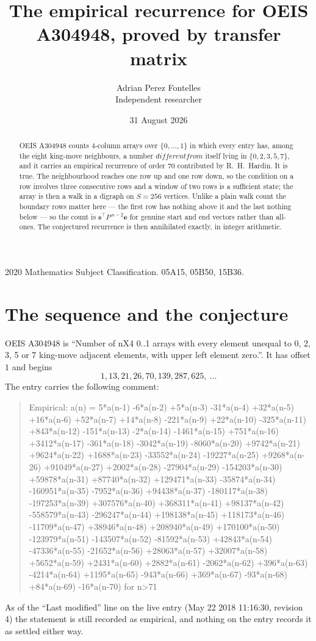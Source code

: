 \documentclass[11pt,a4paper]{article}
\title{The empirical recurrence for OEIS A304948, proved by transfer matrix}
\author{Adrian Perez Fontelles\\ \small Independent researcher}
\date{31 August 2026}
\theoremstyle{plain}
\theoremstyle{definition}
\begin{document}
\maketitle

\begin{abstract}
OEIS A304948 counts $4$-column arrays over $\{0,\dots,1\}$ in which every entry has,
among the eight king-move neighbours, a number $different from$ itself lying in $\{0,2,3,5,7\}$, and it carries an empirical
recurrence of order $70$ contributed by R.~H.~Hardin. It is true. The neighbourhood
reaches one row up and one row down, so the condition on a row involves three consecutive
rows and a window of two rows is a sufficient state; the array is then a walk in a digraph
on $S=256$ vertices. Unlike a plain walk count the boundary rows matter here --- the first
row has nothing above it and the last nothing below --- so the count is
$\mathbf{s}^{\!\top}P^{\,n-2}\mathbf{e}$ for genuine start and end vectors rather than
all-ones. The conjectured recurrence is then annihilated exactly, in integer arithmetic.
\end{abstract}

\noindent\small 2020 Mathematics Subject Classification. 05A15, 05B50, 15B36.\normalsize

\section{The sequence and the conjecture}

OEIS A304948 is ``Number of nX4 0..1 arrays with every element unequal to 0, 2, 3, 5 or 7 king-move adjacent elements, with upper left element zero.''. It has offset
$1$ and begins
\[
1, 13, 21, 26, 70, 139, 287, 625,\ \dots
\]
The entry carries the following comment:
\begin{quote}\small
Empirical: a(n) = 5*a(n-1) -6*a(n-2) +5*a(n-3) -31*a(n-4) +32*a(n-5) +16*a(n-6) +52*a(n-7) +14*a(n-8) -221*a(n-9) +22*a(n-10) -325*a(n-11) +843*a(n-12) -151*a(n-13) -2*a(n-14) -1461*a(n-15) +751*a(n-16) +3412*a(n-17) -361*a(n-18) -3042*a(n-19) -8060*a(n-20) +9742*a(n-21) +9624*a(n-22) +1688*a(n-23) -33552*a(n-24) -19227*a(n-25) +9268*a(n-26) +91049*a(n-27) +2002*a(n-28) -27904*a(n-29) -154203*a(n-30) +59878*a(n-31) +87740*a(n-32) +129471*a(n-33) -35874*a(n-34) -160951*a(n-35) -7952*a(n-36) +94438*a(n-37) -180117*a(n-38) -197253*a(n-39) +307576*a(n-40) +368311*a(n-41) +98137*a(n-42) -558579*a(n-43) -296247*a(n-44) +198138*a(n-45) +118173*a(n-46) -11709*a(n-47) +38946*a(n-48) +208940*a(n-49) +170100*a(n-50) -123979*a(n-51) -143507*a(n-52) -81592*a(n-53) +42843*a(n-54) -47336*a(n-55) -21652*a(n-56) +28063*a(n-57) +32007*a(n-58) +5652*a(n-59) +2431*a(n-60) +2882*a(n-61) -2062*a(n-62) +396*a(n-63) -4214*a(n-64) +1195*a(n-65) -943*a(n-66) +369*a(n-67) -93*a(n-68) +84*a(n-69) -16*a(n-70) for n>71
\end{quote}
As of the ``Last modified'' line on the live entry (May 22 2018 11:16:30, revision
4) the statement is still recorded as empirical, and nothing on the entry
records it as settled either way.
\end{document}
